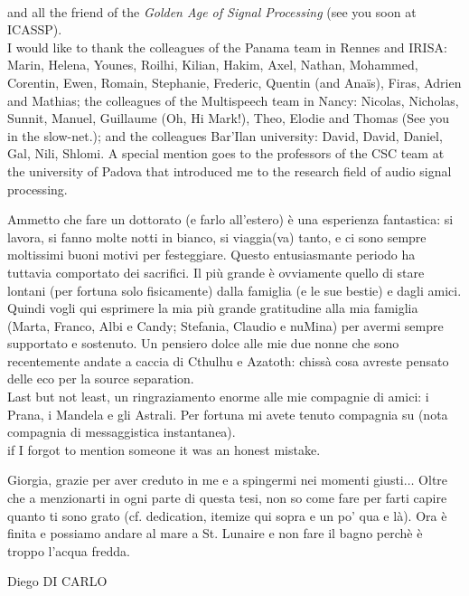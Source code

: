 \\and all the friend of the \textit{Golden Age of Signal Processing} (see you soon at ICASSP).
\\I would like to thank the colleagues of the Panama team in Rennes and IRISA: Marin, Helena, Younes, Roilhi, Kilian, Hakim, Axel, Nathan, Mohammed, Corentin, Ewen, Romain, Stephanie, Frederic, Quentin (and Ana\"is), Firas, Adrien and Mathias;
the colleagues of the Multispeech team in Nancy: Nicolas, Nicholas, Sunnit, Manuel, Guillaume (Oh, Hi Mark!), Theo, Elodie and Thomas (See you in the slow-net.);
and the colleagues Bar'Ilan university: David, David, Daniel, Gal, Nili, Shlomi.
A special mention goes to the professors of the CSC team at the university of Padova that introduced me to the research field of audio signal processing.

\mynewline
Ammetto che fare un dottorato (e farlo all'estero) \`e una esperienza fantastica:
si lavora,
si fanno molte notti in bianco, si viaggia(va) tanto, e ci sono sempre moltissimi buoni motivi per festeggiare.
Questo entusiasmante periodo ha tuttavia comportato dei sacrifici.
Il pi\`u grande \`e ovviamente quello di stare lontani (per fortuna solo fisicamente) dalla famiglia (e le sue bestie) e dagli amici.
Quindi vogli qui esprimere la mia pi\`u grande gratitudine alla mia famiglia (Marta, Franco, Albi e Candy; Stefania, Claudio e nuMina) per avermi sempre supportato e sostenuto.
Un pensiero dolce alle mie due nonne che sono recentemente andate a caccia di Cthulhu e Azatoth: chiss\`a cosa avreste pensato delle eco per la source separation.
\\Last but not least, un ringraziamento enorme alle mie compagnie di amici: i Prana, i Mandela e gli Astrali.
Per fortuna mi avete tenuto compagnia su (nota compagnia di messaggistica instantanea).
\\if I forgot to mention someone it was an honest mistake.

\mynewline
Giorgia, grazie per aver creduto in me e a spingermi nei momenti giusti$\ldots$
Oltre che a menzionarti in ogni parte di questa tesi, non so come fare per farti capire quanto ti sono grato (cf. dedication, itemize qui sopra e un po' qua e l\`a).
Ora \`e finita e possiamo andare al mare a St. Lunaire e non fare il bagno perch\`e \`e troppo l'acqua fredda.

\begin{flushright}
    Diego DI CARLO
\end{flushright}